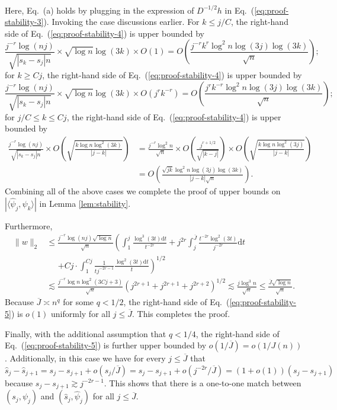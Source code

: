 \documentclass[aos]{imsart}
\renewcommand{\hat}{\widehat}
\renewcommand{\bar}{\overline}
\newcommand{\ud}{\mathrm d}
\theoremstyle{plain}
\theoremstyle{definition}
\theoremstyle{definition}
\begin{document}
\begin{appendix}
\begin{align}
\end{align}
Here, Eq.~(a) holds by plugging in the expression of $D^{-1/2}h$ in Eq.~(\ref{eq:proof-stability-3}).
Invoking the case discussions earlier. For $k\leq j/C$, the right-hand side of Eq.~(\ref{eq:proof-stability-4}) is upper bounded by
$$
 \frac{j^{-r}\log(nj)}{\sqrt{|s_k-s_j|n}}\times \sqrt{\log n}\log(3k)\times O(1) = O\left(\frac{j^{-r}k^r\log^2 n\log(3j)\log(3k)}{\sqrt{n}}\right);
$$
for $k\geq Cj$, the right-hand side of Eq.~(\ref{eq:proof-stability-4}) is upper bounded by 
$$
\frac{j^{-r}\log(nj)}{\sqrt{|s_k-s_j|n}} \times\sqrt{\log n}\log(3k)\times O(j^rk^{-r}) = O\left(\frac{j^rk^{-r}\log^2 n\log(3j)\log(3k)}{\sqrt{n}}\right);
$$
for $j/C\leq k\leq Cj$, the right-hand side of Eq.~(\ref{eq:proof-stability-4}) is upper bounded by
\begin{align*}
\frac{j^{-r}\log(nj)}{\sqrt{|s_k-s_j|n}}\times O\left(\sqrt{\frac{k\log n\log^2(3k)}{|j-k|}}\right) &= \frac{j^{-r}\log^2 n}{\sqrt{n}}\times O\left(\frac{j^{r+1/2}}{\sqrt{|k-j|}}\right)\times O\left(\sqrt{\frac{k\log n\log^2(3j)}{|j-k|}}\right)\\
&= O\left(\frac{\sqrt{jk}\log^2 n\log(3j)\log(3k)}{|j-k|\sqrt{n}}\right).
\end{align*}
Combining all of the above cases we complete the proof of upper bounds on $|\langle\hat\psi_j,\psi_k\rangle|$ in Lemma \ref{lem:stability}.

Furthermore, 
\begin{align}
\|w\|_2 &\leq \frac{j^{-r}\log (nj)\sqrt{\log n}}{\sqrt{n}}\left(\int_1^j \frac{\log^3(3t)\ud t}{t^{-2r}} + j^{2r}\int_j^{\bar J}\frac{t^{-2r}\log^2(3t)}{j^{-2r}}\ud t \right.\nonumber\\
&\;\;\;\;\;\left.+ Cj\cdot \int_1^{Cj}\frac{1}{tj^{-2r-1}}\frac{\log^2(3t)\ud t}{t}\right)^{1/2}\nonumber\\
&\lesssim \frac{j^{-r}\log n\log^2(3Cj+3)}{\sqrt{n}}\left(j^{2r+1} + j^{2r+1} + j^{2r+2}\right)^{1/2} \lesssim  \frac{j\log^3 n}{\sqrt{n}}\leq \frac{\bar J\sqrt{\log n}}{\sqrt{n}}.\label{eq:proof-stability-5}
\end{align}
Because $\bar J\asymp n^q$ for some $q<1/2$, the right-hand side of Eq.~(\ref{eq:proof-stability-5}) is $o(1)$ uniformly for all $j\leq\bar J$. This completes the proof.

Finally, with the additional assumption that $q<1/4$, the right-hand side of Eq.~(\ref{eq:proof-stability-5}) is further upper bounded by $o(1/\bar J)=o(1/J(n))$. 
Additionally, in this case we have for every $j\leq \bar J$ that $\hat s_j-\hat s_{j+1} = s_j-s_{j+1}+o(s_j/\bar J)=s_j-s_{j+1}+o(j^{-2r}/\bar J) = (1+o(1))(s_j-s_{j+1})$ because $s_j-s_{j+1}\gtrsim j^{-2r-1}$.
This shows that there is a one-to-one match between $(s_j,\psi_j)$ and $(\hat s_j,\hat\psi_j)$ for all $j\leq\bar J$.




\end{appendix}
\end{document}
